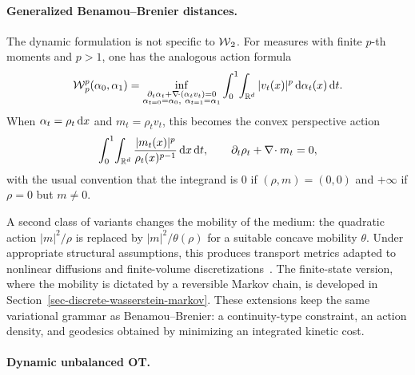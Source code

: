 \paragraph{Generalized Benamou--Brenier distances.}\label{rem-generalized-bb}
	The dynamic formulation is not specific to $\operatorname{\mathcal{W}}_2$. For measures with finite $p$-th moments and $p>1$, one has the analogous action formula
	\[
		\operatorname{\mathcal{W}}_p^p(\alpha_0,\alpha_1)
		=
		\inf_{\substack{\partial_t\alpha_t+\nabla\!\cdot(\alpha_t v_t)=0\\
		\alpha_{t=0}=\alpha_0,\ \alpha_{t=1}=\alpha_1}}
		\int_0^1\!\int_{\mathbb{R}^d} |v_t(x)|^p\,\mathrm{d}\alpha_t(x)\,\mathrm{d} t.
	\]
	When $\alpha_t=\rho_t\,\mathrm{d} x$ and $m_t=\rho_t v_t$, this becomes the convex perspective action
	\[
		\int_0^1\!\int_{\mathbb{R}^d}
		\frac{|m_t(x)|^p}{\rho_t(x)^{p-1}}\,\mathrm{d} x\,\mathrm{d} t,
		\qquad
		\partial_t\rho_t+\nabla\!\cdot m_t=0,
	\]
	with the usual convention that the integrand is $0$ if $(\rho,m)=(0,0)$ and $+\infty$ if $\rho=0$ but $m\neq0$.

	A second class of variants changes the mobility of the medium: the quadratic action $|m|^2/\rho$ is replaced by $|m|^2/\theta(\rho)$ for a suitable concave mobility $\theta$. Under appropriate structural assumptions, this produces transport metrics adapted to nonlinear diffusions and finite-volume discretizations~\cite{dolbeault2009new}. The finite-state version, where the mobility is dictated by a reversible Markov chain, is developed in Section~\ref{sec-discrete-wasserstein-markov}. These extensions keep the same variational grammar as Benamou--Brenier: a continuity-type constraint, an action density, and geodesics obtained by minimizing an integrated kinetic cost.

\paragraph{Dynamic unbalanced OT.}
\label{sec-unbalanced-ot}

